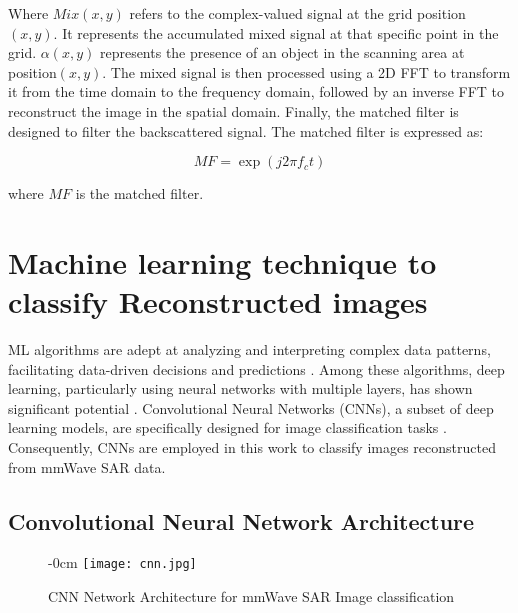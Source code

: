 \documentclass[journal,article,submit,pdftex,moreauthors]{Definitions/mdpi}
\begin{document}
\noindent Where \(Mix(x,y)\) refers to the complex-valued signal at the grid position \((x,y)\). It represents the accumulated mixed signal at that specific point in the grid. \(\text{$\alpha$} (x,y)\) represents the presence of an object in the scanning area at position\((x,y)\). The mixed signal is then processed using a 2D FFT to transform it from the time domain to the frequency domain, followed by an inverse FFT to reconstruct the image in the spatial domain. Finally, the matched filter is designed to filter the backscattered signal. The matched filter is expressed as:

\begin{equation}
 MF = \exp(j 2\pi f_c t)
\end{equation}

\noindent where \(MF\) is the matched filter. 

\section{Machine learning technique to classify Reconstructed images}

ML algorithms are adept at analyzing and interpreting complex data patterns, facilitating data-driven decisions and predictions \cite{hastie2009elements, murphy2012machine}. Among these algorithms, deep learning, particularly using neural networks with multiple layers, has shown significant potential \cite{lecun2015deep}. Convolutional Neural Networks (CNNs), a subset of deep learning models, are specifically designed for image classification tasks \cite{krizhevsky2012imagenet}. Consequently, CNNs are employed in this work to classify images reconstructed from mmWave SAR data.

\subsection{Convolutional Neural Network Architecture}


\begin{figure}[H]
\begin{adjustwidth}{-\extralength}{0cm}
\centering
\texttt{[image: cnn.jpg]}
\end{adjustwidth}
\caption{CNN Network Architecture for mmWave SAR Image classification\label{}}
\end{figure}  
\end{document}
